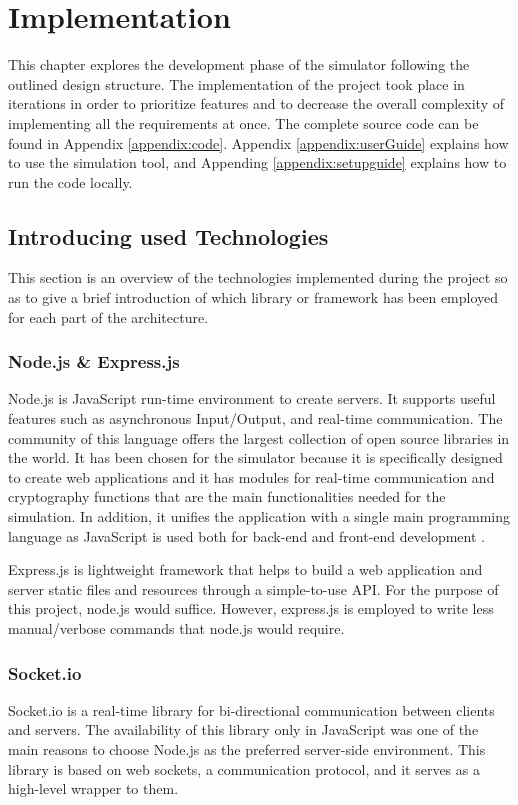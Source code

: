 \chapter{Implementation}
This chapter explores the development phase of the simulator following the outlined design structure. The implementation of the project took place in iterations in order to prioritize features and to decrease the overall complexity of implementing all the requirements at once. The complete source code can be found in Appendix \ref{appendix:code}. Appendix \ref{appendix:userGuide} explains how to use the simulation tool, and Appending \ref{appendix:setupguide} explains how to run the code locally.


\section{Introducing used Technologies}
This section is an overview of the technologies implemented during the project so as to give a brief introduction of which library or framework has been employed for each part of the architecture.


\subsection{Node.js \& Express.js}
Node.js is JavaScript run-time environment to create servers. It supports useful features such as asynchronous Input/Output, and real-time communication. The community of this language offers the largest collection of open source libraries in the world. It has been chosen for the simulator because it is specifically designed to create web applications and it has modules for real-time communication and cryptography functions that are the main functionalities needed for the simulation. In addition, it unifies the application with a single main programming language as JavaScript is used both for back-end and front-end development \cite{Nodejs}. 

Express.js is lightweight framework that helps to build a web application and server static files and resources through a simple-to-use API. For the purpose of this project, node.js would suffice. However, express.js is employed to write less manual/verbose commands that node.js would require.

\subsection{Socket.io}
Socket.io is a real-time library for bi-directional communication between clients and servers. The availability of this library only in JavaScript was one of the main reasons to choose Node.js as the preferred server-side environment. This library is based on web sockets, a communication protocol, and it serves as a high-level wrapper to them.

